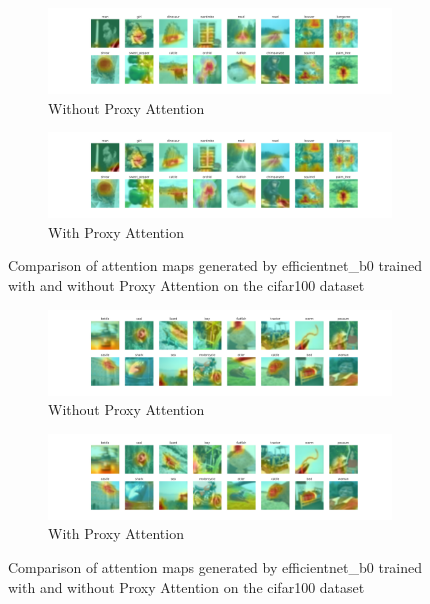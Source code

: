 
    \begin{figure}[H]
        \centering
        \begin{subfigure}[b]{1\textwidth}
            \includegraphics[width=\textwidth]{images/cifar100_efficientnet_b0_noproxy_0.pdf}
            \caption{Without Proxy Attention}
        \end{subfigure}
        \hfill
        \begin{subfigure}[b]{1\textwidth}
            \includegraphics[width=\textwidth]{images/cifar100_efficientnet_b0_proxy_0.pdf}
            \caption{With Proxy Attention}
        \end{subfigure}
        \caption{Comparison of attention maps generated by efficientnet\_b0 trained with and without Proxy Attention on the cifar100 dataset}
    \end{figure}
    

    \begin{figure}[H]
        \centering
        \begin{subfigure}[b]{1\textwidth}
            \includegraphics[width=\textwidth]{images/cifar100_efficientnet_b0_noproxy_1.pdf}
            \caption{Without Proxy Attention}
        \end{subfigure}
        \hfill
        \begin{subfigure}[b]{1\textwidth}
            \includegraphics[width=\textwidth]{images/cifar100_efficientnet_b0_proxy_1.pdf}
            \caption{With Proxy Attention}
        \end{subfigure}
        \caption{Comparison of attention maps generated by efficientnet\_b0 trained with and without Proxy Attention on the cifar100 dataset}
    \end{figure}
    

